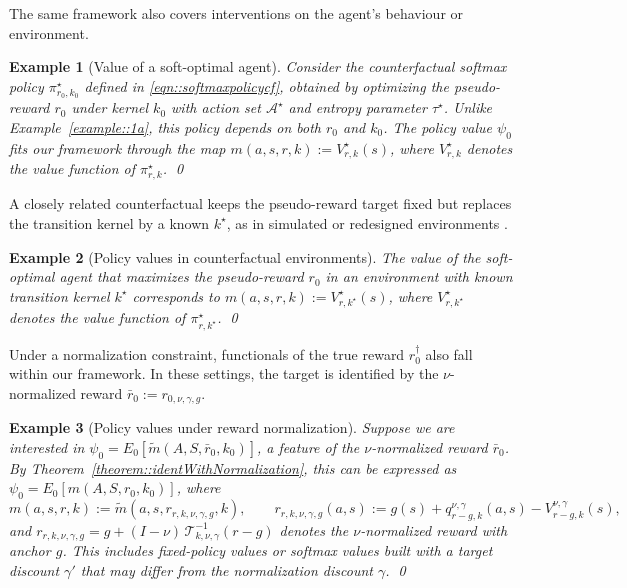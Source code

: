\documentclass[12pt]{article}
\theoremstyle{plain}
\newtheorem{example}{Example}
\begin{document}
\noindent The same framework also covers interventions on the agent's
behaviour or environment.

\renewcommand{\theexample}{1b}
\begin{example}[Value of a soft-optimal agent]
\label{example::1b}
 Consider the counterfactual softmax policy $\pi_{r_0,k_0}^\star$ defined in
\eqref{eqn::softmaxpolicycf}, obtained by optimizing the pseudo-reward $r_0$
under kernel $k_0$ with action set $\mathcal{A}^\star$ and entropy parameter
$\tau^\star$.  
Unlike Example~\ref{example::1a}, this policy depends on both $r_0$ and $k_0$.
The policy value $\psi_0$ fits our framework through the map
$m(a,s,r,k) := V_{r,k}^\star(s)$, where \(V_{r,k}^\star\) denotes the value
function of \(\pi_{r,k}^\star\).  
\qed
\end{example}

\noindent A closely related counterfactual keeps the pseudo-reward target fixed
but replaces the transition kernel by a known \(k^\star\), as in simulated or redesigned environments
\citep[e.g.][]{abbeel2004apprenticeship,ziebart2008maximum,wulfmeier2015deep,fu2018airl}.

\renewcommand{\theexample}{1c}
\begin{example}[Policy values in counterfactual environments]
The value of the soft-optimal agent that maximizes the pseudo-reward $r_0$ in an
environment with known transition kernel $k^\star$ corresponds to
$m(a,s,r,k) := V_{r,k^\star}^\star(s)$, where \(V_{r,k^\star}^\star\) denotes
the value function of \(\pi_{r,k^\star}^\star\).  
\qed
\end{example}

Under a normalization constraint, functionals of the true reward
\(r_0^\dagger\) also fall within our framework. In these settings, the target
is identified by the \(\nu\)-normalized reward
\(\bar r_0 := r_{0,\nu,\gamma,g}\).

\renewcommand{\theexample}{2}
\begin{example}[Policy values under reward normalization]
\label{example::norm}
 Suppose we are interested in
\(\psi_0 = E_0[\tilde m(A,S,\bar r_0,k_0)]\),
a feature of the $\nu$-normalized reward \(\bar r_0\).  
By Theorem~\ref{theorem::identWithNormalization}, this can be expressed as
$\psi_0 = E_0[m(A,S,r_0,k_0)]$, where
\[
m(a,s,r,k)
:= \tilde m(a,s,r_{r,k,\nu,\gamma,g},k), \qquad
r_{r,k,\nu,\gamma,g}(a,s)
:= g(s) + q_{r-g,k}^{\nu,\gamma}(a,s) - V_{r-g,k}^{\nu,\gamma}(s),
 \]
and $r_{r,k,\nu,\gamma,g} = g + (I-\nu)\,\mathcal{T}_{k,\nu,\gamma}^{-1}(r-g)$ denotes
the $\nu$-normalized reward with anchor \(g\). This includes fixed-policy
values or softmax values built with a target discount \(\gamma'\) that may
differ from the normalization discount \(\gamma\).  
\qed
\end{example}
\end{document}
